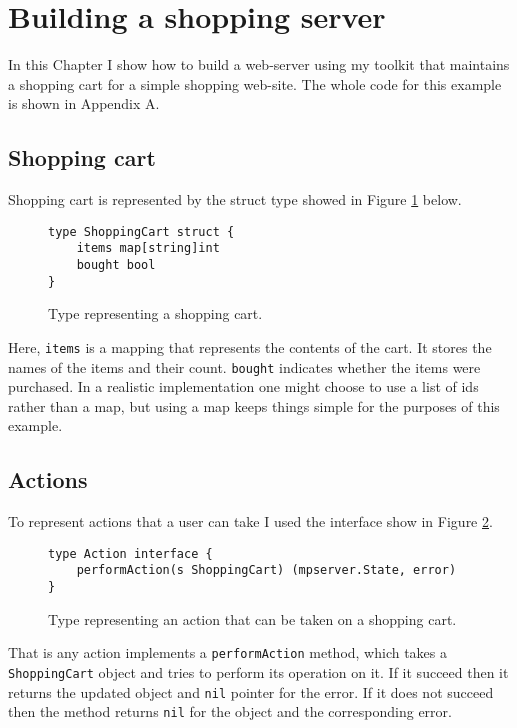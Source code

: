 \section{Building a shopping server}
\label{sec:shopping}
In this Chapter I show how to build a web-server using my toolkit that
maintains a shopping cart for a simple shopping web-site. The whole 
code for this example is shown in Appendix A.

\subsection{Shopping cart}
Shopping cart is represented by the struct type showed in Figure 
\ref{fig:shoppingCart} below.
\begin{figure}[h]
\begin{lstlisting}
type ShoppingCart struct {
    items map[string]int
    bought bool
}
\end{lstlisting}
\caption[scale=1.0]{Type representing a shopping cart.}
\label{fig:shoppingCart}
\end{figure}

Here, \texttt{items} is 
a mapping that represents the contents of the cart. It stores the names
of the items and their count. \texttt{bought} indicates whether the items
were purchased. In a realistic implementation one might choose to use 
a list of ids rather than a map, but using a map keeps things simple
for the purposes of this example.

\subsection{Actions}
To represent actions that a user can take I used the interface show in 
Figure \ref{fig:action}.
\begin{figure}[h]
\begin{lstlisting}
type Action interface {
    performAction(s ShoppingCart) (mpserver.State, error)
}
\end{lstlisting}
\caption[scale=1.0]{Type representing an action that can be taken on 
a shopping cart.}
\label{fig:action}
\end{figure}
That is any action implements a \texttt{performAction} method, which takes
a \texttt{ShoppingCart} object and tries to perform its operation on it. If
it succeed then it returns the updated object and \texttt{nil} pointer for the
error. If it does not succeed then the method returns \texttt{nil} for the
object and the corresponding error.

